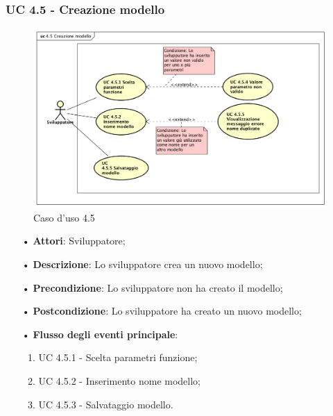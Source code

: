 \subsubsection{UC 4.5 - Creazione modello}
\begin{figure}[H]
\centering
\includegraphics[width=17cm]{img/UC450.png} 
\caption{Caso d'uso 4.5}\label{fig:450}
\end{figure}
\begin{itemize}
\item[•]\textbf{Attori}: Sviluppatore;
\item[•]\textbf{Descrizione}: Lo sviluppatore crea un nuovo modello;
\item[•]\textbf{Precondizione}: Lo sviluppatore non ha creato il modello;
\item[•]\textbf{Postcondizione}: Lo sviluppatore ha creato un nuovo modello;
\item[•]\textbf{Flusso degli eventi principale}:  
\begin{enumerate}
	\item UC 4.5.1 - Scelta parametri funzione;
	\item UC 4.5.2 - Inserimento nome modello;
	\item UC 4.5.3 - Salvataggio modello.
\end{enumerate}
\end{itemize}

